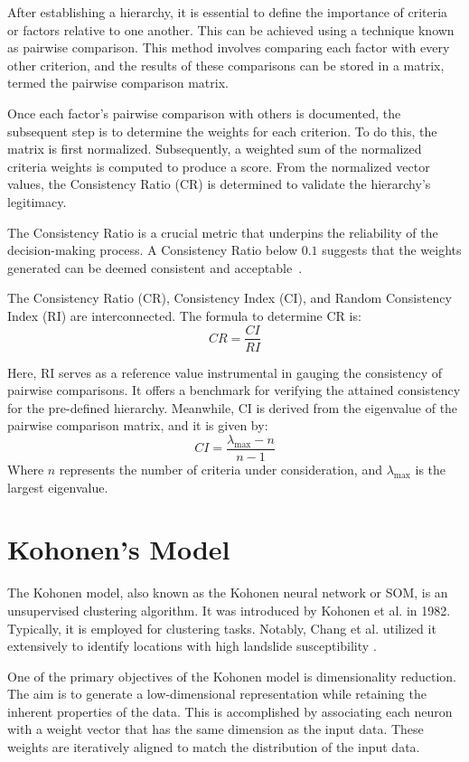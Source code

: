 \documentclass[a4paper,12pt]{Classes/RoboticsLaTeX}
\begin{document}
	After establishing a hierarchy, it is essential to define the importance of criteria or factors relative to one another. This can be achieved using a technique known as 
	pairwise comparison. This method involves comparing each factor with every other criterion, and the results of these comparisons can be stored in a matrix, termed the 
	pairwise comparison matrix.

	Once each factor's pairwise comparison with others is documented, the subsequent step is to determine the weights for each criterion. To do this, the matrix is first normalized. 
	Subsequently, a weighted sum of the normalized criteria weights is computed to produce a score. From the normalized vector values, the Consistency Ratio (CR) is determined to 
	validate the hierarchy's legitimacy.

	The Consistency Ratio is a crucial metric that underpins the reliability of the decision-making process. A Consistency Ratio below \(0.1\) suggests that the weights generated 
	can be deemed consistent and acceptable~\cite{saaty1988}.

	The Consistency Ratio (CR), Consistency Index (CI), and Random Consistency Index (RI) are interconnected. The formula to determine CR is:
	\[ CR = \frac{CI}{RI} \]

	Here, RI serves as a reference value instrumental in gauging the consistency of pairwise comparisons. It offers a benchmark for verifying the attained consistency for the pre-defined hierarchy. Meanwhile, CI is derived from the eigenvalue of the pairwise comparison matrix, and it is given by:
	\[ CI = \frac{\lambda_{\text{max}} - n}{n - 1} \]
	Where \(n\) represents the number of criteria under consideration, and \(\lambda_{\text{max}}\) is the largest eigenvalue.


	\section{Kohonen's Model}

	The Kohonen model, also known as the Kohonen neural network or \ac{SOM}, is an unsupervised clustering algorithm. It was introduced by Kohonen et al. 
	in 1982\cite{kohonen1982}. Typically, it is employed for clustering tasks. Notably, Chang et al. utilized it extensively to identify locations with high landslide susceptibility
	\cite{chang2020}.

	One of the primary objectives of the Kohonen model is dimensionality reduction. The aim is to generate a low-dimensional representation while retaining the inherent 
	properties of the data. This is accomplished by associating each neuron with a weight vector that has the same dimension as the input data. These weights are iteratively 
	aligned to match the distribution of the input data.
\end{document}
